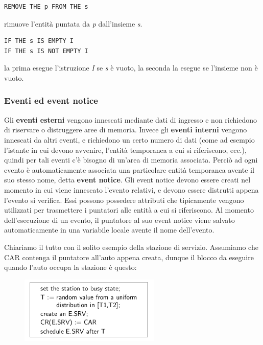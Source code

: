 \documentclass[11pt]{book}
\begin{document}
\begin{verbatim}
REMOVE THE p FROM THE s 
\end{verbatim}

rimuove l'entit\`a puntata da {\em p} dall'insieme {\em s}.

\begin{verbatim}
IF THE s IS EMPTY I 
IF THE s IS NOT EMPTY I 
\end{verbatim}

la prima esegue l'istruzione {\em I} se {\em s} \`e vuoto, la seconda
la esegue se l'insieme non \`e vuoto.

\subsubsection{Eventi ed event notice}
Gli {\bf eventi esterni} vengono innescati mediante dati di ingresso e
non richiedono di riservare o distruggere aree di memoria. Invece gli
{\bf eventi interni} vengono innescati da altri eventi, e richiedono
un certo numero di dati (come ad esempio l'istante in cui devono
avvenire, l'entit\`a temporanea a cui si riferiscono, ecc.), quindi per
tali eventi c'\`e bisogno di un'area di memoria associata. Perci\`o ad
ogni evento \`e automaticamente associata una particolare entit\`a
temporanea avente il suo stesso nome, detta {\bf event notice}. Gli
event notice devono essere creati nel momento in cui viene innescato
l'evento relativi, e devono essere distrutti appena l'evento si
verifica. Essi possono possedere attributi che tipicamente vengono
utilizzati per trasmettere i puntatori alle entit\`a a cui si
riferiscono. Al momento dell'esecuzione di un evento, il puntatore al
suo event notice viene salvato automaticamente in una variabile locale
avente il nome dell'evento.

Chiariamo il tutto con il solito esempio della stazione di servizio.
Assumiamo che CAR contenga il puntatore all'auto appena creata, dunque
il blocco da eseguire quando l'auto occupa la stazione \`e questo:

\begin{figure}[H]
  \centering
  \includegraphics[width=0.6\textwidth]{images/cap11fig34.png}
\end{figure}
\end{document}
